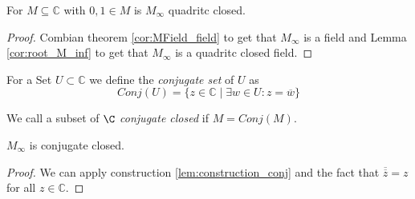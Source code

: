 \begin{lemma}
    For $M\subseteq \mathbb{C}$ with $0,1 \in M$ is $M_{\infty}$ quadritc closed.
\end{lemma}
\begin{proof}
    Combian theorem \ref{cor:MField_field} to get that $M_{\infty}$ is a field and Lemma \ref{cor:root_M_inf} to get that $M_{\infty}$ is a quadritc closed field.
\end{proof}

\begin{definition}
    For a Set $U \subset \mathbb{C}$ we define the \emph{conjugate set} of $U$ as 
    \begin{equation*}
        Conj(U) = \{z\in \mathbb{C} \mid \exists w\in U: z = \overline{w}\}
    \end{equation*}
\end{definition}

\begin{definition}
    We call a subset of $\C$ \emph{conjugate closed} if $M= Conj(M)$.
\end{definition}

\begin{lemma}
    $M_{\infty}$ is conjugate closed.
\end{lemma}
\begin{proof}
    We can apply construction \ref{lem:construction_conj} and the fact that $\overline{\overline z} = z$ for all $z \in\mathbb{C}$.
\end{proof}


